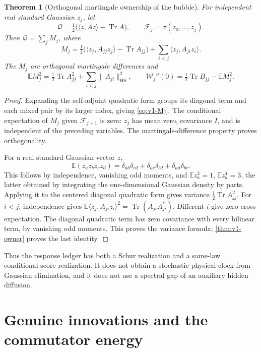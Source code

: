 \documentclass[11pt,a4paper]{article}
\newtheorem{theorem}{Theorem}[section]
\theoremstyle{definition}
\theoremstyle{remark}
\DeclareMathOperator{\Tr}{Tr}
\newcommand{\E}{\mathbb E}
\newcommand{\ip}[2]{\langle #1,#2\rangle}
\newcommand{\norm}[1]{\lVert #1\rVert}
\newcommand{\HS}{\mathrm{HS}}
\begin{document}
\begin{theorem}[Orthogonal martingale ownership of the bubble]
\label{thm:v1-score}
For independent real standard Gaussian $z_j$, let
\[
 \mathcal Q=\tfrac12\bigl(\ip{z}{Az}-\Tr A\bigr),\qquad
 \mathcal F_j=\sigma(z_0,\ldots,z_j).
\]
Then $\mathcal Q=\sum_jM_j$, where
\begin{equation}\label{eq:v1-Mj}
 M_j=\tfrac12\bigl(\ip{z_j}{A_{jj}z_j}-\Tr A_{jj}\bigr)
                       +\sum_{i<j}\ip{z_j}{A_{ji}z_i}.
\end{equation}
The $M_j$ are orthogonal martingale differences and
\begin{equation}\label{eq:v1-scorevar}
 \E M_j^2=\tfrac12\Tr A_{jj}^2+\sum_{i<j}\norm{A_{ji}}_\HS^2,
 \qquad
 \mathcal W_j''(0)=\tfrac12\Tr B_{jj}-\E M_j^2.
\end{equation}
\end{theorem}
\begin{proof}
Expanding the self-adjoint quadratic form groups its diagonal term and
each mixed pair by its larger index, giving \cref{eq:v1-Mj}.
The conditional expectation of $M_j$ given $\mathcal F_{j-1}$ is zero:
$z_j$ has mean zero, covariance $I$, and is independent of the preceding
variables. The martingale-difference property proves orthogonality.

For a real standard Gaussian vector $z$,
\[
 \E(z_az_bz_cz_d)=\delta_{ab}\delta_{cd}
                  +\delta_{ac}\delta_{bd}+\delta_{ad}\delta_{bc}.
\]
This follows by independence, vanishing odd moments, and
$\E z_a^2=1$, $\E z_a^4=3$, the latter obtained by integrating the
one-dimensional Gaussian density by parts. Applying it to the centered
diagonal quadratic form gives variance $\tfrac12\Tr A_{jj}^2$.
For $i<j$, independence gives
$\E\ip{z_j}{A_{ji}z_i}^2=\Tr(A_{ji}A_{ji}^*)$.
Different $i$ give zero cross expectation. The diagonal quadratic term
has zero covariance with every bilinear term, by vanishing odd moments.
This proves the variance formula; \cref{thm:v1-owner} proves the last
identity.
\end{proof}

Thus the response ledger has both a Schur realization and a same-law
conditional-score realization. It does not obtain a stochastic physical
clock from Gaussian elimination, and it does not use a spectral gap of
an auxiliary hidden diffusion.

\section{Genuine innovations and the commutator energy}
\label{sec:v1-commutator}
\end{document}
